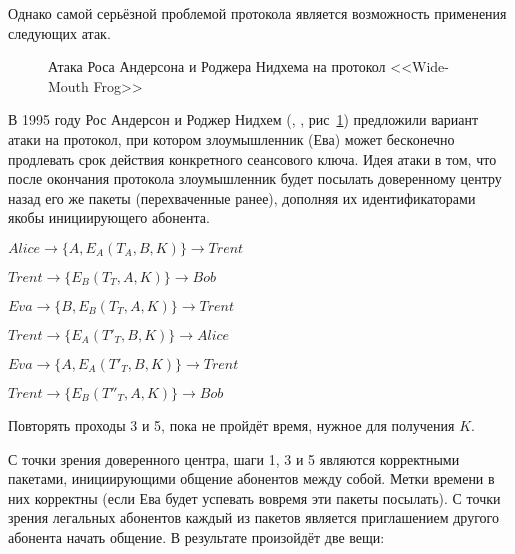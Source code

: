 Однако самой серьёзной проблемой протокола является возможность применения следующих атак.

\begin{figure}
	\centering
	\begin{sequencediagram}
		
	\end{sequencediagram}
	\caption{Атака Роса Андерсона и Роджера Нидхема на протокол <<Wide-Mouth Frog>>\label{fig:key_distribution-wide-mouth_frog-Anderson-Needham-attack}}
\end{figure}

В 1995 году Рос Андерсон и Роджер Нидхем (, \cite{Anderson:Needham:1995}, рис~\ref{fig:key_distribution-wide-mouth_frog-Anderson-Needham-attack}) предложили вариант атаки на протокол, при котором злоумышленник (Ева) может бесконечно продлевать срок действия конкретного сеансового ключа. Идея атаки в том, что после окончания протокола злоумышленник будет посылать доверенному центру назад его же пакеты (перехваченные ранее), дополняя их идентификаторами якобы инициирующего абонента.

\begin{protocol}
	\item[(1)] $Alice \to \{ A, E_A \left( T_A, B, K \right) \} \to Trent$
	\item[(2)] $Trent \to \{ E_B \left( T_T, A, K \right) \} \to Bob$
	\item[(3)] $Eva \to \{ B, E_B \left( T_T, A, K \right) \} \to Trent$
	\item[(4)] $Trent \to \{ E_A \left( T'_T, B, K \right) \} \to Alice$
	\item[(5)] $Eva \to \{ A, E_A \left( T'_T, B, K \right) \} \to Trent$
	\item[(6)] $Trent \to \{ E_B \left( T''_T, A, K \right) \} \to Bob$
	\item[{}] Повторять проходы 3 и 5, пока не пройдёт время, нужное для получения $K$.
\end{protocol}

С точки зрения доверенного центра, шаги 1, 3 и 5 являются корректными пакетами, инициирующими общение абонентов между собой. Метки времени в них корректны (если Ева будет успевать вовремя эти пакеты посылать). С точки зрения легальных абонентов каждый из пакетов является приглашением другого абонента начать общение. В результате произойдёт две вещи:

